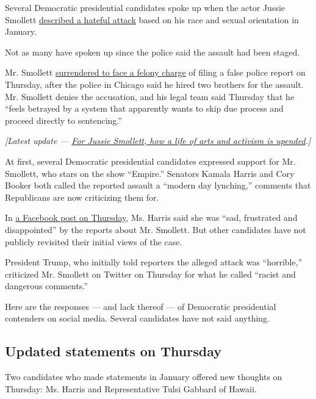 Several Democratic presidential candidates spoke up when the actor
Jussie Smollett
\href{https://www.nytimes3xbfgragh.onion/2019/01/29/arts/television/empire-jussie-smollett-attacked.html}{described
a hateful attack} based on his race and sexual orientation in January.

Not as many have spoken up since the police said the assault had been
staged.

Mr. Smollett
\href{https://www.nytimes3xbfgragh.onion/2019/02/21/arts/jussie-smollett-empire-fox.html}{surrendered
to face a felony charge} of filing a false police report on Thursday,
after the police in Chicago said he hired two brothers for the assault.
Mr. Smollett denies the accusation, and his legal team said Thursday
that he ``feels betrayed by a system that apparently wants to skip due
process and proceed directly to sentencing.''

\emph{{[}Latest update ---}
\href{https://www.nytimes3xbfgragh.onion/2019/02/23/us/jussie-smollett.html?action=click\&module=Intentional\&pgtype=Article}{\emph{For
Jussie Smollett, how a life of arts and activism is upended}}\emph{.{]}}

At first, several Democratic presidential candidates expressed support
for Mr. Smollett, who stars on the show ``Empire.'' Senators Kamala
Harris and Cory Booker both called the reported assault a ``modern day
lynching,'' comments that Republicans are now criticizing them for.

In
\href{https://www.facebookcorewwwi.onion/KamalaHarris/posts/10157494880507923}{a
Facebook post on Thursday}, Ms. Harris said she was ``sad, frustrated
and disappointed'' by the reports about Mr. Smollett. But other
candidates have not publicly revisited their initial views of the case.

President Trump, who initially told reporters the alleged attack was
``horrible,'' criticized Mr. Smollett on Twitter on Thursday for what he
called ``racist and dangerous comments.''

Here are the responses --- and lack thereof --- of Democratic
presidential contenders on social media. Several candidates have not
said anything.

\hypertarget{updated-statements-on-thursday}{%
\subsection{Updated statements on
Thursday}\label{updated-statements-on-thursday}}

Two candidates who made statements in January offered new thoughts on
Thursday: Ms. Harris and Representative Tulsi Gabbard of Hawaii.

